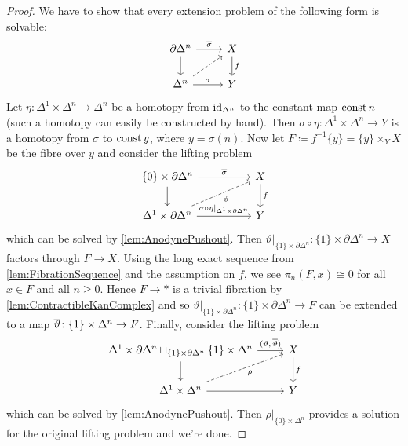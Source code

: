 \begin{proof}
	We have to show that every extension problem of the following form is solvable:
	\begin{equation*}
		\begin{tikzcd}
			\partial\Delta^n\rar["\ov\sigma"]\dar& X\dar["f"]\\
			\Delta^n\urar[dashed]\rar["\sigma"] & Y
		\end{tikzcd}
	\end{equation*}
	Let $\eta\colon\Delta^1\times\Delta^n\rightarrow\Delta^n$ be a homotopy from $\operatorname{id}_{\Delta^n}$ to the constant map $\operatorname{const} n$ (such a homotopy can easily be constructed by hand). Then $\sigma\circ \eta\colon\Delta^1\times\Delta^n\rightarrow Y$ is a homotopy from $\sigma$ to $\operatorname{const} y$, where $y=\sigma(n)$. Now let $F\coloneqq f^{-1}\{y\}=\{y\}\times_YX$ be the fibre over $y$ and consider the lifting problem
	\begin{equation*}
		\begin{tikzcd}[column sep=huge]
			\{0\}\times\partial\Delta^n\rar["\ov\sigma"]\dar & X\dar["f"]\\
			\Delta^1\times\partial\Delta^n\urar[dashed,"\vartheta"']\rar["\sigma\circ\eta|_{\Delta^1\times\partial\Delta^n}"] & Y
		\end{tikzcd}
	\end{equation*}
	which can be solved by \cref{lem:AnodynePushout}. Then $\vartheta|_{\{1\}\times\partial\Delta^n}\colon \{1\}\times\partial\Delta^n\rightarrow X$ factors through $F\rightarrow X$. Using the long exact sequence from \cref{lem:FibrationSequence} and the assumption on $f$, we see $\pi_n(F,x)\cong0$ for all $x\in F$ and all $n\geqslant 0$. Hence $F\rightarrow *$ is a trivial fibration by \cref{lem:ContractibleKanComplex} and so $\vartheta|_{\{1\}\times\partial\Delta^n}\colon \{1\}\times\partial\Delta^n\rightarrow F$ can be extended to a map $\ov\vartheta\colon \{1\}\times\Delta^n\rightarrow F$. Finally, consider the lifting problem
	\begin{equation*}
		\begin{tikzcd}
			\Delta^1\times\partial\Delta^n\sqcup_{\{1\}\times\partial\Delta^n}\{1\}\times\Delta^n\rar["{(\vartheta,\,\ov\vartheta)}"]\dar & X\dar["f"]\\
			\Delta^1\times\Delta^n\urar[dashed,"\rho"']\rar & Y
		\end{tikzcd}
	\end{equation*}
	which can be solved by \cref{lem:AnodynePushout}. Then $\rho|_{\{0\}\times\Delta^n}$ provides a solution for the original lifting problem and we're done.
\end{proof}
